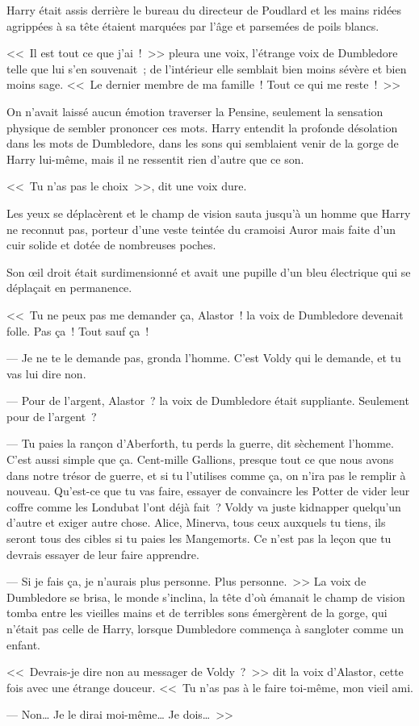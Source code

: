 \begin{em}
Harry était assis derrière le bureau du directeur de Poudlard et les mains ridées agrippées à sa tête étaient marquées par l'âge et parsemées de poils blancs.

<<~Il est tout ce que j'ai~!~>> pleura une voix, l'étrange voix de Dumbledore telle que lui s'en souvenait~; de l'intérieur elle semblait bien moins sévère et bien moins sage. <<~Le dernier membre de ma famille~! Tout ce qui me reste~!~>>

On n'avait laissé aucun émotion traverser la Pensine, seulement la sensation physique de sembler prononcer ces mots. Harry entendit la profonde désolation dans les mots de Dumbledore, dans les sons qui semblaient venir de la gorge de Harry lui-même, mais il ne ressentit rien d'autre que ce son.

<<~Tu n'as pas le choix~>>, dit une voix dure.

Les yeux se déplacèrent et le champ de vision sauta jusqu'à un homme que Harry ne reconnut pas, porteur d'une veste teintée du cramoisi Auror mais faite d'un cuir solide et dotée de nombreuses poches.

Son œil droit était surdimensionné et avait une pupille d'un bleu électrique qui se déplaçait en permanence.

<<~Tu ne peux pas me demander ça, Alastor~! la voix de Dumbledore devenait folle. Pas ça~! Tout sauf ça~!

--- Je ne te le demande pas, gronda l'homme. C'est Voldy qui le demande, et tu vas lui dire non.

--- Pour de l'argent, Alastor~? la voix de Dumbledore était suppliante. Seulement pour de l'argent~?

--- Tu paies la rançon d'Aberforth, tu perds la guerre, dit sèchement l'homme. C'est aussi simple que ça. Cent-mille Gallions, presque tout ce que nous avons dans notre trésor de guerre, et si tu l'utilises comme ça, on n'ira pas le remplir à nouveau. Qu'est-ce que tu vas faire, essayer de convaincre les Potter de vider leur coffre comme les Londubat l'ont déjà fait~? Voldy va juste kidnapper quelqu'un d'autre et exiger autre chose. Alice, Minerva, tous ceux auxquels tu tiens, ils seront tous des cibles si tu paies les Mangemorts. Ce n'est pas la leçon que tu devrais essayer de leur faire apprendre.

--- Si je fais ça, je n'aurais plus personne. Plus personne.~>> La voix de Dumbledore se brisa, le monde s'inclina, la tête d'où émanait le champ de vision tomba entre les vieilles mains et de terribles sons émergèrent de la gorge, qui n'était pas celle de Harry, lorsque Dumbledore commença à sangloter comme un enfant.

<<~Devrais-je dire non au messager de Voldy~?~>> dit la voix d'Alastor, cette fois avec une étrange douceur. <<~Tu n'as pas à le faire toi-même, mon vieil ami.

--- Non… Je le dirai moi-même… Je dois…~>>
\end{em}

